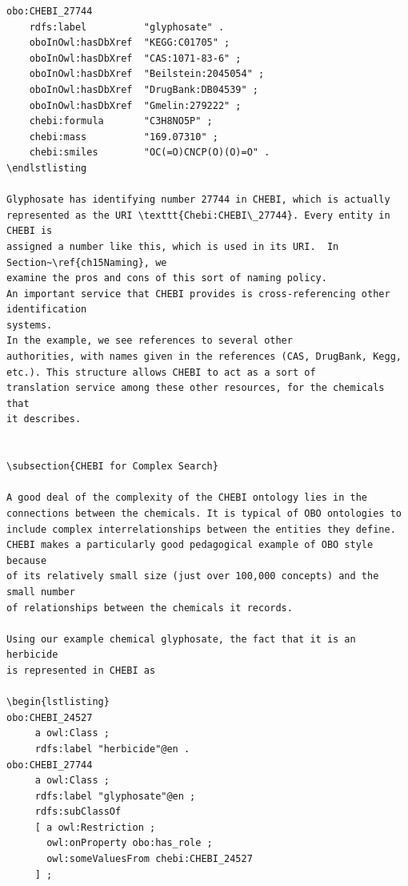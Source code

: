 \begin{lstlisting}
obo:CHEBI_27744  
    rdfs:label          "glyphosate" .
    oboInOwl:hasDbXref  "KEGG:C01705" ;
    oboInOwl:hasDbXref  "CAS:1071-83-6" ;
    oboInOwl:hasDbXref  "Beilstein:2045054" ;
    oboInOwl:hasDbXref  "DrugBank:DB04539" ;
    oboInOwl:hasDbXref  "Gmelin:279222" ;
    chebi:formula       "C3H8NO5P" ;
    chebi:mass          "169.07310" ;
    chebi:smiles        "OC(=O)CNCP(O)(O)=O" .
\endlstlisting

Glyphosate has identifying number 27744 in CHEBI, which is actually
represented as the URI \texttt{Chebi:CHEBI\_27744}. Every entity in CHEBI is
assigned a number like this, which is used in its URI.  In Section~\ref{ch15Naming}, we
examine the pros and cons of this sort of naming policy. 
An important service that CHEBI provides is cross-referencing other identification
systems.  
In the example, we see references to several other
authorities, with names given in the references (CAS, DrugBank, Kegg,
etc.). This structure allows CHEBI to act as a sort of
translation service among these other resources, for the chemicals that
it describes.


\subsection{CHEBI for Complex Search}

A good deal of the complexity of the CHEBI ontology lies in the
connections between the chemicals. It is typical of OBO ontologies to
include complex interrelationships between the entities they define.
CHEBI makes a particularly good pedagogical example of OBO style because
of its relatively small size (just over 100,000 concepts) and the small number
of relationships between the chemicals it records.

Using our example chemical glyphosate, the fact that it is an herbicide
is represented in CHEBI as

\begin{lstlisting}
obo:CHEBI_24527
     a owl:Class ;
     rdfs:label "herbicide"@en .
obo:CHEBI_27744
     a owl:Class ;
     rdfs:label "glyphosate"@en ;
     rdfs:subClassOf
     [ a owl:Restriction ;
       owl:onProperty obo:has_role ;
       owl:someValuesFrom chebi:CHEBI_24527
     ] ;
\end{lstlisting}


